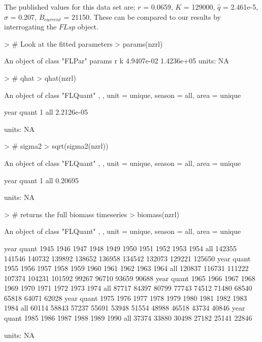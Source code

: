 \documentclass[a4paper]{article}
\begin{document}
The published values for this data set are:
$r$ = 0.0659, 
$K$ = 129000, 
$\hat{q}$ = 2.461e-5, 
$\sigma$ = 0.207, 
$B_{current}$ = 21150. 
These can be compared to our results by interrogating the $FLsp$ object.
\begin{center}
\begin{minipage}[H]{0.95\textwidth}%
\begin{shaded}%
\begin{Schunk}
\begin{Sinput}
> # Look at the fitted parameters
> params(nzrl)
\end{Sinput}
\begin{Soutput}
An object of class "FLPar"
params
         r          k 
4.9407e-02 1.4236e+05 
units:  NA 
\end{Soutput}
\begin{Sinput}
> # qhat
> qhat(nzrl)
\end{Sinput}
\begin{Soutput}
An object of class "FLQuant"
, , unit = unique, season = all, area = unique

     year
quant 1         
  all 2.2126e-05

units:  NA 
\end{Soutput}
\begin{Sinput}
> # sigma2
> sqrt(sigma2(nzrl))
\end{Sinput}
\begin{Soutput}
An object of class "FLQuant"
, , unit = unique, season = all, area = unique

     year
quant 1      
  all 0.20695

units:  NA 
\end{Soutput}
\begin{Sinput}
> # returns the full biomass timeseries
> biomass(nzrl)
\end{Sinput}
\begin{Soutput}
An object of class "FLQuant"
, , unit = unique, season = all, area = unique

     year
quant 1945   1946   1947   1948   1949   1950   1951   1952   1953   1954  
  all 142355 141546 140732 139892 138652 136958 134542 132073 129221 125650
     year
quant 1955   1956   1957   1958   1959   1960   1961   1962   1963   1964  
  all 120837 116731 111222 107374 104231 101592  99267  96710  93659  90688
     year
quant 1965   1966   1967   1968   1969   1970   1971   1972   1973   1974  
  all  87717  84397  80799  77743  74512  71480  68540  65818  64071  62028
     year
quant 1975   1976   1977   1978   1979   1980   1981   1982   1983   1984  
  all  60114  58843  57237  55691  53948  51554  48988  46518  43734  40846
     year
quant 1985   1986   1987   1988   1989   1990  
  all  37374  33880  30498  27182  25141  22846

units:  NA 
\end{Soutput}
\end{Schunk}
\end{shaded}%
\end{minipage}
\end{center}
\end{document}
